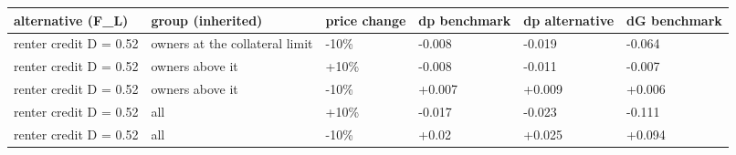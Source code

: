 \begingroup\small
\setlength{\tabcolsep}{3pt}
\renewcommand{\arraystretch}{1.04}
\begin{tabularx}{\linewidth}{XXXXXX}
\toprule
alternative (F\_L) & group (inherited) & price change & dp benchmark & dp alternative & dG benchmark \\
\midrule
renter credit D = 0.52 & owners at the collateral limit & -10\% & -0.008 & -0.019 & -0.064 \\
renter credit D = 0.52 & owners above it & +10\% & -0.008 & -0.011 & -0.007 \\
renter credit D = 0.52 & owners above it & -10\% & +0.007 & +0.009 & +0.006 \\
renter credit D = 0.52 & all & +10\% & -0.017 & -0.023 & -0.111 \\
renter credit D = 0.52 & all & -10\% & +0.02 & +0.025 & +0.094 \\
\bottomrule
\end{tabularx}
\endgroup
